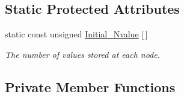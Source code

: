 \subsection*{Static Protected Attributes}
\begin{DoxyCompactItemize}
\item 
static const unsigned \hyperlink{classoomph_1_1TRaviartThomasDarcyElement_a703400ff2df7722ffd9771c22bd70811}{Initial\+\_\+\+Nvalue} \mbox{[}$\,$\mbox{]}
\begin{DoxyCompactList}\small\item\em The number of values stored at each node. \end{DoxyCompactList}\end{DoxyCompactItemize}
\subsection*{Private Member Functions}
